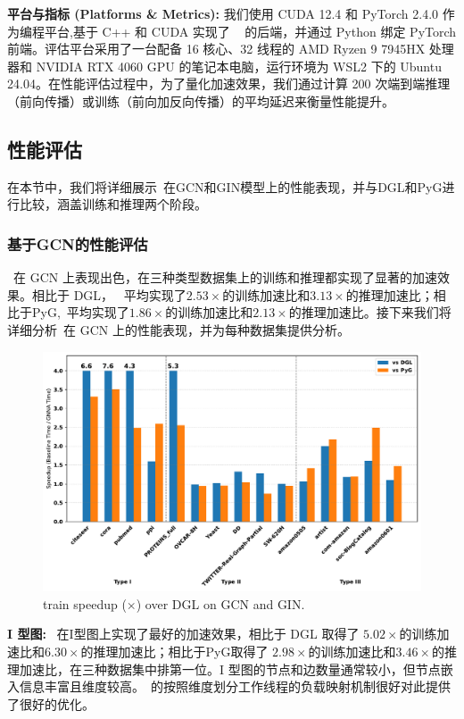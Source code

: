 \textbf{平台与指标 (Platforms \& Metrics): }
\label{sect: Platforms and Metrics }
我们使用 CUDA 12.4 和 PyTorch 2.4.0 作为编程平台,基于 C++ 和 CUDA 实现了 ~\Mname{} 的后端，并通过 Python 绑定 PyTorch 前端。评估平台采用了一台配备 16 核心、32 线程的 AMD Ryzen 9 7945HX 处理器和 NVIDIA RTX 4060 GPU 的笔记本电脑，运行环境为 WSL2 下的 Ubuntu 24.04。在性能评估过程中，为了量化加速效果，我们通过计算 200 次端到端推理（前向传播）或训练（前向加反向传播）的平均延迟来衡量性能提升。
\subsection{性能评估}
在本节中，我们将详细展示~\Mname{}在GCN和GIN模型上的性能表现，并与DGL和PyG进行比较，涵盖训练和推理两个阶段。
\subsubsection{基于GCN的性能评估}
~\Mname{}在 GCN 上表现出色，在三种类型数据集上的训练和推理都实现了显著的加速效果。相比于 DGL， ~\Mname{}平均实现了$2.53 \times $的训练加速比和$3.13\times$的推理加速比；相比于PyG,~\Mname{}平均实现了$1.86\times$的训练加速比和$2.13\times$的推理加速比。接下来我们将详细分析~\Mname{}在 GCN 上的性能表现，并为每种数据集提供分析。
\begin{figure}[htbp] 
    \centering
    \includegraphics[width=\linewidth]{images/gcn_train_compare.pdf} 
    \caption{train speedup ($\times$) over DGL on GCN and GIN.}
    \label{fig: train-speedup-on-gcn}
    \setlength{\abovecaptionskip}{0.4cm} %
    \setlength{\belowcaptionskip}{-0.4cm} %
\end{figure}

\textbf{I 型图:}
~\Mname{}在I型图上实现了最好的加速效果，相比于 DGL 取得了 $5.02\times$的训练加速比和$6.30\times$的推理加速比；相比于PyG取得了 $2.98\times$的训练加速比和$3.46\times$的推理加速比，在三种数据集中排第一位。I 型图的节点和边数量通常较小，但节点嵌入信息丰富且维度较高。~\Mname{}的按照维度划分工作线程的负载映射机制很好对此提供了很好的优化。

